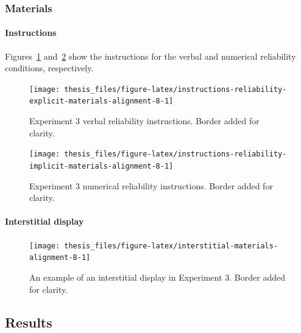 \documentclass[a4paper, nobind, dvipsnames]{templates/ociamthesis}
\theoremstyle{definition}
\theoremstyle{definition}
\theoremstyle{definition}
\theoremstyle{definition}
\theoremstyle{remark}
\begin{document}
\newpage

\hypertarget{materials-11}{%
\subsubsection{Materials}\label{materials-11}}

\hypertarget{instructions-materials-alignment-8-appendix}{%
\paragraph{Instructions}\label{instructions-materials-alignment-8-appendix}}

Figures~\ref{fig:instructions-reliability-explicit-materials-alignment-8}
and~\ref{fig:instructions-reliability-implicit-materials-alignment-8} show the
instructions for the verbal and numerical reliability conditions, respectively.



\begin{figure}
\texttt{[image: thesis\_files/figure-latex/instructions-reliability-explicit-materials-alignment-8-1]} \caption{Experiment 3 verbal reliability instructions. Border added for clarity.}\label{fig:instructions-reliability-explicit-materials-alignment-8}
\end{figure}



\begin{figure}
\texttt{[image: thesis\_files/figure-latex/instructions-reliability-implicit-materials-alignment-8-1]} \caption{Experiment 3 numerical reliability instructions. Border added for clarity.}\label{fig:instructions-reliability-implicit-materials-alignment-8}
\end{figure}

\hypertarget{interstitial-materials-alignment-8}{%
\paragraph{Interstitial display}\label{interstitial-materials-alignment-8}}



\begin{figure}
\texttt{[image: thesis\_files/figure-latex/interstitial-materials-alignment-8-1]} \caption{An example of an interstitial display in Experiment 3. Border added for clarity.}\label{fig:interstitial-materials-alignment-8}
\end{figure}

\hypertarget{results-6}{%
\subsection{Results}\label{results-6}}
\end{document}
